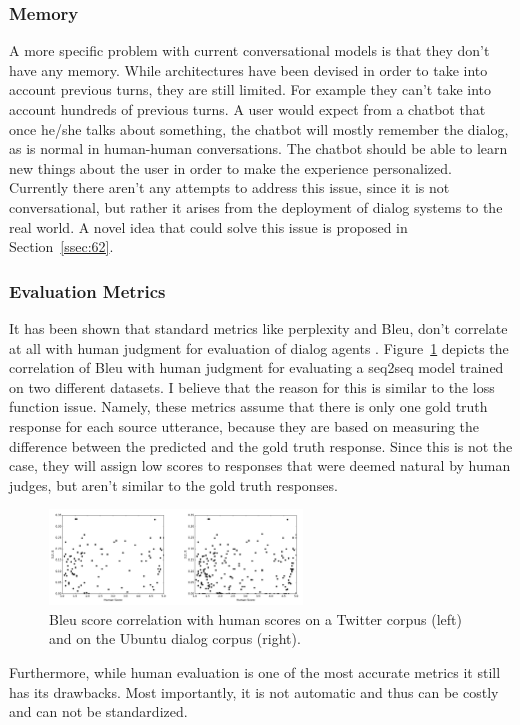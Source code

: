 \documentclass[12pt]{article}
\begin{document}
\subsubsection{Memory} \label{sssec:memory}
A more specific problem with current conversational models is that they don't have any memory. While architectures have been devised in order to take into account previous turns, they are still limited. For example they can't take into account hundreds of previous turns. A user would expect from a chatbot that once he/she talks about something, the chatbot will mostly remember the dialog, as is normal in human-human conversations. The chatbot should be able to learn new things about the user in order to make the experience personalized. Currently there aren't any attempts to address this issue, since it is not conversational, but rather it arises from the deployment of dialog systems to the real world. A novel idea that could solve this issue is proposed in Section~\ref{ssec:62}.

\subsubsection{Evaluation Metrics} \label{sssec:metrics}
It has been shown that standard metrics like perplexity and Bleu, don't correlate at all with human judgment for evaluation of dialog agents \cite{Tao:2017,Liu:2016}. Figure~\ref{fig:bleu} depicts the correlation of Bleu with human judgment for evaluating a seq2seq model trained on two different datasets. I believe that the reason for this is similar to the loss function issue. Namely, these metrics assume that there is only one gold truth response for each source utterance, because they are based on measuring the difference between the predicted and the gold truth response. Since this is not the case, they will assign low scores to responses that were deemed natural by human judges, but aren't similar to the gold truth responses.
\begin{figure}[H]
	\centering
	\includegraphics[width=0.6\textwidth]{pics/bleu.png}
	\caption{Bleu score correlation with human scores \cite{Liu:2016} on a Twitter corpus (left) and on the Ubuntu dialog corpus \cite{Lowe:2015} (right).}
	\label{fig:bleu}
\end{figure}
Furthermore, while human evaluation is one of the most accurate metrics it still has its drawbacks. Most importantly, it is not automatic and thus can be costly and can not be standardized.
\end{document}
